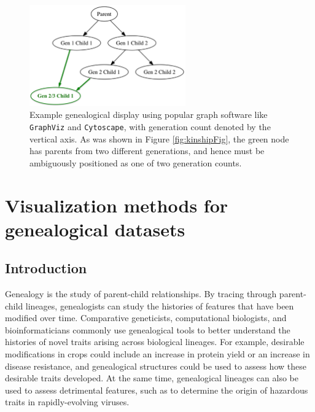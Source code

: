 \documentclass[11pt,a4paper,oldfontcommands,openany]{memoir}
\numberwithin{equation}{section} %
\newcommand{\pkg}[1]{{\texttt{#1}}}
\begin{document}
\begin{figure}[H]
    \begin{framed}
    \centering
    \includegraphics[width=0.6\textwidth]{Graph}
    \end{framed}
    \caption{Example genealogical display using popular graph software like \pkg{GraphViz} and \pkg{Cytoscape}, with generation count denoted by the vertical axis. As was shown in Figure \ref{fig:kinshipFig}, the green node has parents from two different generations, and hence must be ambiguously positioned as one of two generation counts.}
    \label{fig:Graph}
\end{figure}










 
\chapter{Visualization methods for genealogical datasets}
\label{sec:ggenealogy}

\section{Introduction}

Genealogy is the study of parent-child relationships. By tracing through parent-child lineages, genealogists can study the histories of features that have been modified over time. Comparative geneticists, computational biologists, and bioinformaticians commonly use genealogical tools to better understand the histories of novel traits arising across biological lineages. For example, desirable modifications in crops could include an increase in protein yield or an increase in disease resistance, and genealogical structures could be used to assess how these desirable traits developed. At the same time, genealogical lineages can also be used to assess detrimental features, such as to determine the origin of hazardous traits in rapidly-evolving viruses.
\end{document}
